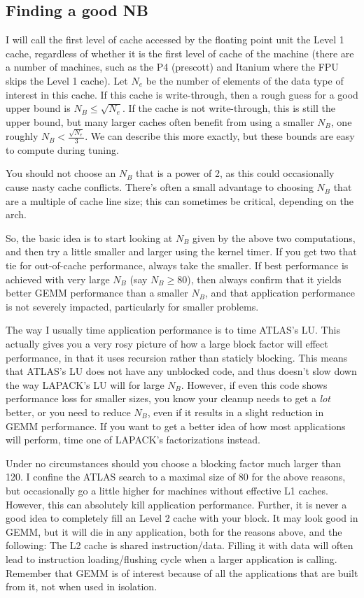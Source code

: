 \documentclass[11pt]{article}
\begin{document}
\subsection{Finding a good NB}
I will call the first level of cache accessed by the floating point unit
the Level 1 cache, regardless of whether it is the first level of cache
of the machine (there are a number of machines, such as the P4 (prescott)
and Itanium where the FPU skips the Level 1 cache).  Let $N_e$ be the
number of elements of the data type of interest in this cache.  If this
cache is write-through, then a rough guess for a good upper bound is
$N_B \le \sqrt{N_e}$.  If the cache is not write-through, this is still
the upper bound, but many larger caches often benefit from using a smaller
$N_B$, one roughly $N_B < \frac{\sqrt{N_e}}{3}$.  We can describe this
more exactly, but these bounds are easy to compute during tuning.  

You should not choose an $N_B$ that is a power of 2, as this could occasionally
cause nasty cache conflicts.  There's often a small advantage to choosing
$N_B$ that are a multiple of cache line size; this can sometimes be critical,
depending on the arch.

So, the basic idea is to start looking at $N_B$ given by the above two
computations, and then try a little smaller and larger using the kernel
timer.  If you get two that tie for out-of-cache performance, always take
the smaller.  If best performance is achieved with very large $N_B$ (say
$N_B \ge 80$), then always confirm that it yields better GEMM performance
than a smaller $N_B$, and that application performance is not severely
impacted, particularly for smaller problems.

The way I usually time application performance is to time ATLAS's LU.
This actually gives you a very rosy picture of how a large block factor
will effect performance, in that it uses recursion rather than staticly
blocking.  This means that ATLAS's LU does not have any unblocked code,
and thus doesn't slow down the way LAPACK's LU will for large $N_B$.
However, if even this code shows performance loss for smaller sizes,
you know your cleanup needs to get a {\em lot} better, or you need
to reduce $N_B$, even if it results in a slight reduction in GEMM
performance.
If you want to get a better idea of how most applications will perform,
time one of LAPACK's factorizations instead.

Under no circumstances should you choose a blocking factor much larger
than 120.  I confine the ATLAS search to a maximal size of 80 for the
above reasons, but occasionally go a little higher for machines without
effective L1 caches.  However, this can absolutely kill application
performance.  Further, it is never a good idea to completely fill
an Level 2 cache with your block.  It may look good in GEMM, but it
will die in any application, both for the reasons above, and the
following: The L2 cache is shared instruction/data.  Filling it
with data will often lead to instruction loading/flushing cycle
when a larger application is calling.  Remember that GEMM is of
interest because of all the applications that are built from it,
not when used in isolation.
\end{document}
